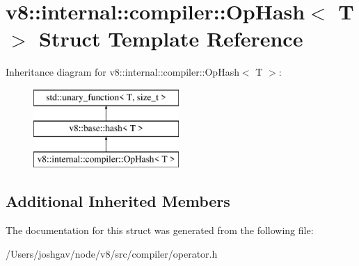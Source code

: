 \hypertarget{structv8_1_1internal_1_1compiler_1_1_op_hash}{}\section{v8\+:\+:internal\+:\+:compiler\+:\+:Op\+Hash$<$ T $>$ Struct Template Reference}
\label{structv8_1_1internal_1_1compiler_1_1_op_hash}
Inheritance diagram for v8\+:\+:internal\+:\+:compiler\+:\+:Op\+Hash$<$ T $>$\+:\begin{figure}[H]
\begin{center}
\leavevmode
\includegraphics[height=3.000000cm]{structv8_1_1internal_1_1compiler_1_1_op_hash}
\end{center}
\end{figure}
\subsection*{Additional Inherited Members}


The documentation for this struct was generated from the following file\+:\begin{DoxyCompactItemize}
\item 
/\+Users/joshgav/node/v8/src/compiler/operator.\+h\end{DoxyCompactItemize}
